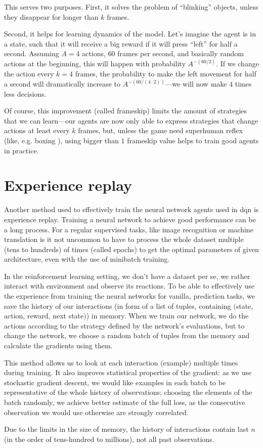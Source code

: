 This serves two purposes. First, it solves the problem of ``blinking'' objects, unless they disappear for longer than $k$ frames.

Second, it helps for learning dynamics of the model. Let's imagine the agent is in a state, such that it will receive a big reward if it will press ``left'' for half a second. Assuming $A=4$ actions, $60$ frames per second, and basically random actions at the beginning, this will happen with probability $A^{-(60 / 2)}$. If we change the action every $k=4$ frames, the probability to make the left movement for half a second will dramatically increase to $A^{-(60/(4 \cdot 2))}$---we will now make $4$ times less decisions.

Of course, this improvement (called frameskip) limits the amount of strategies that we can learn---our agents are now only able to express strategies that change actions at least every $k$ frames, but, unless the game need superhuman reflex (like, e.g. boxing ), using bigger than $1$ frameskip value helps to train good agents in practice.

\section{Experience replay}
Another method used to effectively train the neural network agents used in dqn is experience replay. Training a neural network to achieve good performance can be a long process. For a regular supervised tasks, like image recognition or machine translation is it not uncommon to have to process the whole dataset multiple (tens to hundreds) of times (called epochs) to get the optimal parameters of given architecture, even with the use of minibatch training.

In the reinforcement learning setting, we don't have a dataset per se, we rather interact with environment and observe its reactions. To be able to effectively use the experience from training the neural networks for vanilla, prediction tasks, we save the history of our interactions (in form of a list of tuples, containing $($state, action, reward, next state$)$) in memory. When we train our network, we do the actions according to the strategy defined by the network's evaluations, but to change the network, we choose a random batch of tuples from the memory and calculate the gradients using them.

This method allows us to look at each interaction (example) multiple times during training. It also improves statistical properties of the gradient: as we use stochastic gradient descent, we would like examples in each batch to be representative of the whole history of observations; choosing the elements of the batch randomly, we achieve better estimate of the full loss, as the consecutive observation we would use otherwise are strongly correlated.

Due to the limits in the size of memory, the history of interactions contain last $n$ (in the order of tens-hundred to millions), not all past observations.
